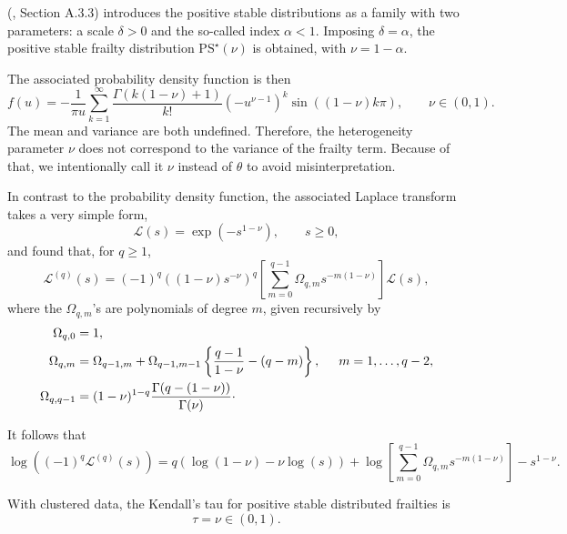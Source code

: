 \citeauthor{Hougaard00} (\citeyear{Hougaard00}, Section A.3.3)
  introduces the positive stable distributions as a family with two parameters:
  a scale $\delta>0$ and the so-called index $\alpha<1$.
Imposing $\delta=\alpha$, 
  the positive stable frailty distribution $\mathrm{PS}^\star(\nu)$ is obtained,
  with $\nu = 1-\alpha$.

The associated probability density function is then
\begin{equation*} 
  f(u) = - \frac1{\pi u} \sum_{k=1}^{\infty} \frac{\Gamma ( k (1 - \nu ) + 1 )}{k!} 
    \left( - u^{ \nu - 1} \right)^{k} \sin ( ( 1 - \nu ) k \pi ),
    \qquad \nu \in (0,1).
\end{equation*}
The mean and variance are both undefined. 
Therefore, the heterogeneity parameter $\nu$ does not correspond to the variance of the frailty term.
Because of that, we intentionally call it $\nu$ instead of $\theta$ to avoid misinterpretation.

In contrast to the probability density function,
  the associated Laplace transform takes a very simple form,
\begin{equation*} 
  \mathcal L (s) = \exp \left( - s^{1 - \nu} \right), 
  \qquad s \geq 0,
\end{equation*}
and \cite{WangEtal95} found that, for $q \geq 1$, 
\begin{equation*}
  \mathcal{L}^{(q)} ( s ) = ( - 1 )^{q} \left( (1 - \nu ) s^{- \nu} \right)^{q} %
    \left[ \sum_{m=0}^{q-1} \Omega_{q, m} s^{- m ( 1 - \nu )} \right]
    \mathcal L (s),
\end{equation*}
where the $\Omega_{q, m}$'s are polynomials of degree $m$, given recursively by
\begin{align}
  \Omega_{q, 0} & = 1, 
    \nonumber \\
  \Omega_{q, m} & = \Omega_{q - 1, m} + \Omega_{q - 1, m - 1} \left\{ \frac{q - 1}{1 - \nu} - (q - m) \right\}, \hspace{0.5cm} m = 1, \ldots, q - 2, 
    \label{eq:PSOmegas}\\
  \Omega_{q, q - 1} & = (1 - \nu )^{1 - q} \frac{\Gamma ( q - (1 - \nu) )}{\Gamma ( \nu )}\cdot 
    \nonumber 
\end{align}

It follows that
\begin{equation}
\log \left( ( - 1 )^{q} \mathcal{L}^{( q )} ( s ) \right) = q \left( \log ( 1 - \nu ) - \nu \log ( s ) \right) + 
	\log \left[ \sum_{m=0}^{q-1} \Omega_{q, m} s^{- m ( 1 - \nu )} \right] - s^{1 - \nu}.
\label{eqn:possta}
\end{equation}

With clustered data, the Kendall's tau for positive stable distributed frailties is 
\begin{equation*}
  \tau = \nu \in (0, 1).
\end{equation*}

